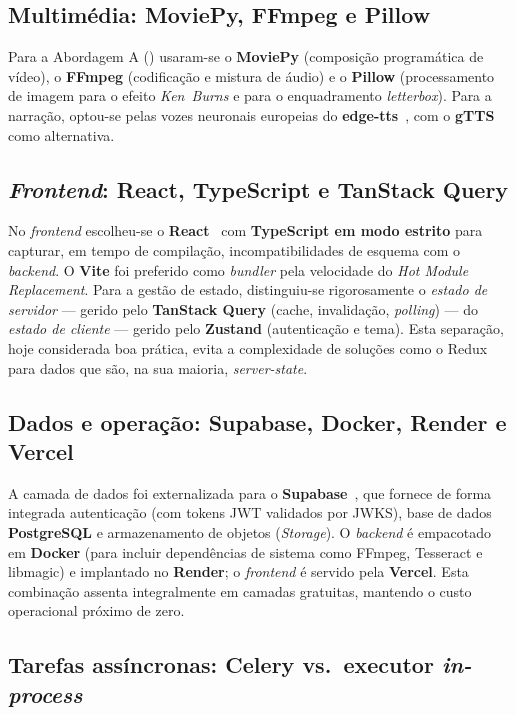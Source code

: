 \subsection{Multimédia: MoviePy, FFmpeg e Pillow}

Para a Abordagem A () usaram-se o \textbf{MoviePy}
(composição programática de vídeo), o \textbf{FFmpeg} (codificação e
mistura de áudio) e o \textbf{Pillow} (processamento de imagem para o
efeito \emph{Ken~Burns} e para o enquadramento \emph{letterbox}). Para a
narração, optou-se pelas vozes neuronais europeias do \textbf{edge-tts}~\cite{edgetts},
com o \textbf{gTTS} como alternativa.

\subsection{\emph{Frontend}: React, TypeScript e TanStack Query}

No \emph{frontend} escolheu-se o \textbf{React}~\cite{react} com \textbf{TypeScript em
modo estrito} para capturar, em tempo de compilação, incompatibilidades
de esquema com o \emph{backend}. O \textbf{Vite} foi preferido como
\emph{bundler} pela velocidade do \emph{Hot Module Replacement}. Para a
gestão de estado, distinguiu-se rigorosamente o \emph{estado de servidor}
— gerido pelo \textbf{TanStack Query} (cache, invalidação,
\emph{polling}) — do \emph{estado de cliente} — gerido pelo
\textbf{Zustand} (autenticação e tema). Esta separação, hoje considerada
boa prática, evita a complexidade de soluções como o Redux para dados que
são, na sua maioria, \emph{server-state}.

\subsection{Dados e operação: Supabase, Docker, Render e Vercel}

A camada de dados foi externalizada para o \textbf{Supabase}~\cite{supabase}, que fornece
de forma integrada autenticação (com tokens JWT validados por JWKS),
base de dados \textbf{PostgreSQL} e armazenamento de objetos
(\emph{Storage}). O \emph{backend} é empacotado em \textbf{Docker} (para
incluir dependências de sistema como FFmpeg, Tesseract e libmagic) e
implantado no \textbf{Render}; o \emph{frontend} é servido pela
\textbf{Vercel}. Esta combinação assenta integralmente em camadas
gratuitas, mantendo o custo operacional próximo de zero.

\subsection{Tarefas assíncronas: Celery vs.\ executor \emph{in-process}}
\label{sub:async}


